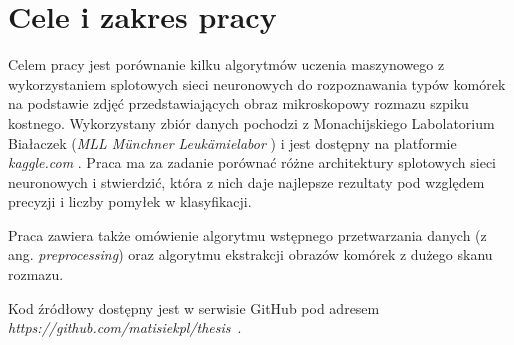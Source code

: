 \section{Cele i zakres pracy}

Celem pracy jest porównanie kilku algorytmów uczenia maszynowego z wykorzystaniem splotowych sieci neuronowych do rozpoznawania typów komórek na podstawie zdjęć przedstawiających obraz mikroskopowy rozmazu szpiku kostnego.
Wykorzystany zbiór danych pochodzi z
Monachijskiego Labolatorium Białaczek (\textit{MLL Münchner Leukämielabor} \cite{mll}) i jest dostępny na platformie \textit{kaggle.com} \cite{dataset}.
Praca ma za zadanie porównać różne architektury splotowych sieci neuronowych i stwierdzić, która z nich daje najlepsze rezultaty pod względem precyzji i liczby pomyłek w klasyfikacji.

Praca zawiera także omówienie algorytmu wstępnego przetwarzania danych (z ang. \textit{preprocessing}) oraz algorytmu ekstrakcji obrazów komórek z dużego skanu rozmazu.

Kod źródłowy dostępny jest w serwisie GitHub pod adresem \textit{https://github.com/matisiekpl/thesis}~\cite{code}.